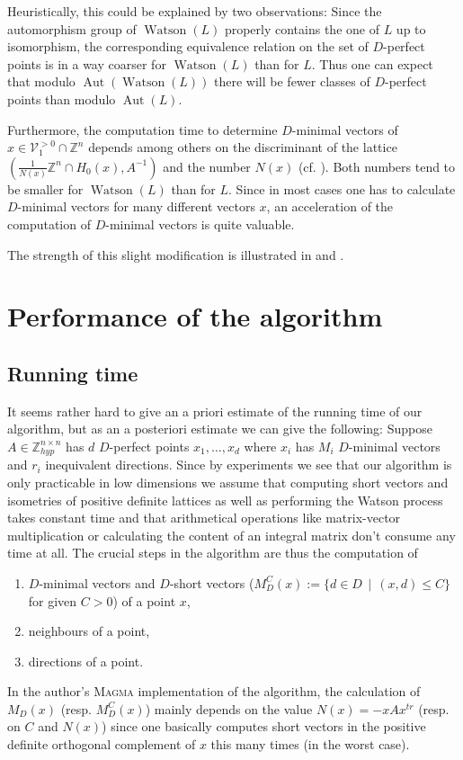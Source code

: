 \documentclass[10pt, preprint]{elsarticle}
\theoremstyle{definition}
\theoremstyle{definition}
\newcommand{\Z}{\mathbb{Z}}
\newcommand{\V}{\mathcal{V}}
\newcommand{\Zhyp}{\Z^{n\times n}_{hyp}}
\newcommand{\Aut}{\operatorname{Aut}}
\newcommand{\Vgt}{\V_1^{>0}}
\newcommand{\Watson}{\operatorname{Watson}}
\begin{document}
Heuristically, this could be explained by two observations: Since the automorphism group of $\Watson(L)$ properly contains the one of $L$ up to isomorphism, the corresponding equivalence relation on the set of $D$-perfect points is in a way coarser for $\Watson(L)$ than for $L$. Thus one can expect that modulo $\Aut(\Watson(L))$ there will be fewer classes of $D$-perfect points than modulo $\Aut(L)$. 

Furthermore, the computation time to determine $D$-minimal vectors of $x\in\Vgt\cap\Z^n$ depends among others on the discriminant of the lattice $(\tfrac{1}{N(x)}\Z^n\cap H_0(x),A^{-1})$ and the number $N(x)$ (cf. ). Both numbers tend to be smaller for $\Watson(L)$ than for $L$. Since in most cases one has to calculate $D$-minimal vectors for many different vectors $x$, an acceleration of the computation of $D$-minimal vectors is quite valuable.

The strength of this slight modification is illustrated in  and .
\section{Performance of the algorithm}\label{secPerformance}
\subsection{Running time}\label{subRun}
It seems rather hard to give an a priori estimate of the running time of our algorithm, but as an a posteriori estimate we can give the following: Suppose $A\in\Zhyp$ has $d$ $D$-perfect points $x_1,\dots ,x_d$ where $x_i$ has $M_i$ $D$-minimal vectors and $r_i$ inequivalent directions. Since by experiments we see that our algorithm is only practicable in low dimensions we assume that computing short vectors and isometries of positive definite lattices as well as performing the Watson process takes constant time and that arithmetical operations like matrix-vector multiplication or calculating the content of an integral matrix don't consume any time at all. The crucial steps in the algorithm are thus the computation of
\begin{enumerate}
\item $D$-minimal vectors and $D$-short vectors ($M_D^C(x):=\{d\in D\,\mid \, (x,d)\leq C\}$ for given $C>0$) of a point $x$,
\item neighbours of a point,
\item directions of a point.
\end{enumerate}
In the author's \textsc{Magma} implementation of the algorithm, the calculation of $M_D(x)$ (resp. $M_D^C(x)$) mainly depends on the value $N(x)=-xAx^{tr}$ (resp. on $C$ and $N(x)$) since one basically computes short vectors in the positive definite orthogonal complement of $x$ this many times (in the worst case).  
\end{document}
